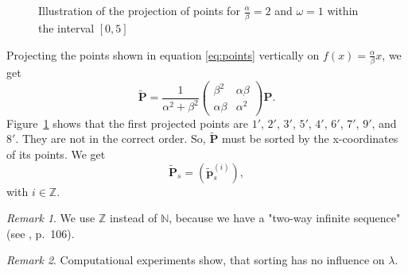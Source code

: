 \documentclass[11pt]{article}
\theoremstyle{remark}
\newtheorem{remark}{Remark}
\begin{document}
\begin{figure}[htbp]
    \centering
	\caption{Illustration of the projection of points for $\frac{\alpha}{\beta} = 2$ and $\omega = 1$ within the interval $[0, 5]$}
    \label{fig:a2o1}
\end{figure}
%
Projecting the points shown in equation \ref{eq:points} vertically on $f(x) = \frac{\alpha}{\beta} x$, we get
%
\begin{equation}
\mathbf{\tilde{P}}
= \frac{1}{\alpha^2 + \beta^2} \begin{pmatrix} \beta^2 & \alpha \beta \\ \alpha \beta & \alpha^2 \end{pmatrix} \mathbf{P}.\label{eq:c}
\end{equation}
%
Figure~\ref{fig:a2o1} shows that the first projected points are $1'$, $2'$, $3'$, $5'$, $4'$, $6'$, $7'$, $9'$, and $8'$. They are not in the correct order. So, $\mathbf{\tilde{P}}$ must be sorted by the x-coordinates of its points. We get
\begin{equation}
\mathbf{\tilde{P}}_s = \left(\mathbf{\tilde{p}}_s^{(i)} \right),\label{eq:sort}
\end{equation}
with $i \in \mathbb{Z}$.
%
\begin{remark}
We use $\mathbb{Z}$ instead of $\mathbb{N}$, because we have a "two-way infinite sequence" (see \cite{Senechal2009}, p.~106).
\end{remark}
%
\begin{remark}
Computational experiments show, that sorting has no influence on $\lambda$.
\end{remark}
\end{document}
